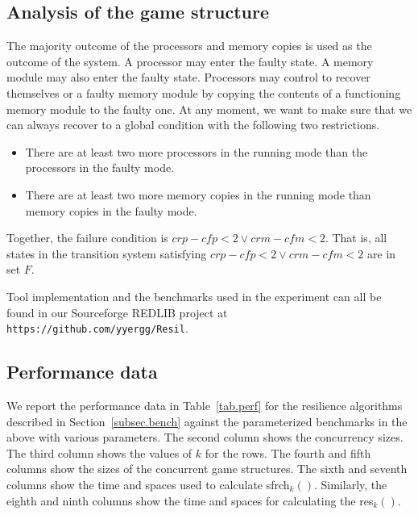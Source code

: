 \subsection*{Analysis of the game structure} 
The majority outcome of the processors and memory copies 
is used as the outcome of the system.  
A processor may enter the faulty state.  
A memory module may also enter the faulty state. 
Processors may control to recover themselves or a faulty memory module 
by copying the contents of a functioning memory module to 
the faulty one.  
At any moment, we want to make sure that we can always recover 
to a global condition with the following two restrictions. 
\begin{itemize} 
\item There are at least two more processors in \label{reply2.2more} 
	the running mode than the processors in the faulty mode.  
\item There are at least two more memory copies in 
	the running mode than memory copies in the faulty mode. 
\end{itemize} 
Together, the failure condition is 
$\textit{crp}-\textit{cfp}<2\vee\textit{crm}-\textit{cfm}<2$.  
That is, all states in the transition system satisfying 
$\textit{crp}-\textit{cfp}<2\vee\textit{crm}-\textit{cfm}<2$ 
are in set $F$.  

Tool implementation and the benchmarks used in the experiment 
can all be found in our Sourceforge REDLIB project at 
\verb+https://github.com/yyergg/Resil+.
\subsection{Performance data}
We report the performance data 
in Table~\ref{tab.perf} for the resilience algorithms 
described in Section~\ref{subsec.bench} 
against the parameterized benchmarks in the above with various 
parameters.  
The second column shows the concurrency sizes.  
The third column shows the values of $k$ for the rows.  
The fourth and fifth columns show the sizes of the concurrent game structures.  
The sixth and seventh columns show the time and spaces used to calculate 
sfrch$_k()$.  
Similarly, the eighth and ninth columns show the time and spaces for calculating 
the res$_k()$.  

